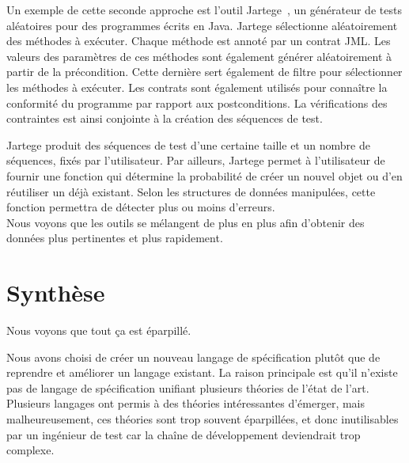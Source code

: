 Un exemple de cette seconde approche est l'outil Jartege~, un
générateur de tests aléatoires pour des programmes écrits en Java. Jartege
sélectionne aléatoirement des méthodes à exécuter.  Chaque méthode est annoté
par un contrat JML. Les valeurs des paramètres de ces méthodes sont également
générer aléatoirement à partir de la précondition. Cette dernière sert également
de filtre pour sélectionner les méthodes à exécuter. Les contrats sont également
utilisés pour connaître la conformité du programme par rapport aux
postconditions. La vérifications des contraintes est ainsi conjointe à la
création des séquences de test.

Jartege produit des séquences de test d'une certaine taille et un nombre de
séquences, fixés par l'utilisateur. Par ailleurs, Jartege permet à l'utilisateur
de fournir une fonction qui détermine la probabilité de créer un nouvel objet ou
d'en réutiliser un déjà existant. Selon les structures de données manipulées,
cette fonction permettra de détecter plus ou moins d'erreurs. \\

Nous voyons que les outils se mélangent de plus en plus afin d'obtenir des
données plus pertinentes et plus rapidement.

\section{Synthèse}

Nous voyons que tout ça est éparpillé.

Nous avons choisi de créer un nouveau langage de spécification plutôt que de
reprendre et améliorer un langage existant.
La raison principale est qu'il n'existe pas de langage de spécification unifiant
plusieurs théories de l'état de l'art. Plusieurs langages ont permis à des
théories intéressantes d'émerger, mais malheureusement, ces théories sont
trop souvent éparpillées, et donc inutilisables par un ingénieur de test car la
chaîne de développement deviendrait trop complexe.
